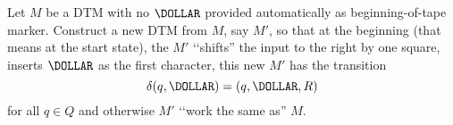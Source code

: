 Let $M$ be a DTM with no $\DOLLAR$ provided automatically as
beginning-of-tape marker.
Construct a new DTM from $M$, say $M'$,
so that at the beginning (that means at the start state),
the $M'$ \lq\lq shifts'' the input to the right by one square,
inserts $\DOLLAR$ as the first character, this new $M'$ has
the transition
\[
\delta(q, \DOLLAR) = (q, \DOLLAR, R)
\]
for all $q \in Q$
and otherwise $M'$ \lq\lq work the same as'' $M$.
